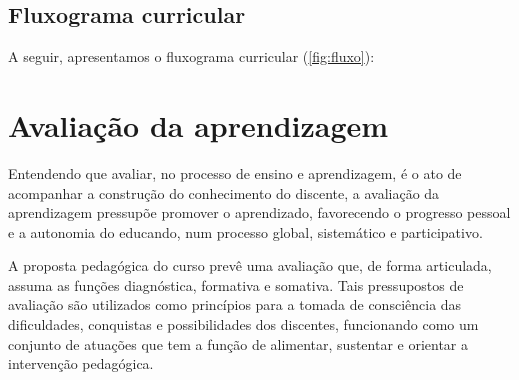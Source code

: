 \documentclass[
	12pt,				%
	openright,			%
	twoside,			%
	a4paper,			%
	chapter=TITLE,		%
	english,			%
	french,				%
	spanish,			%
	brazil,				%
	]{abntex2}
\begin{document}
\begin{landscape}

\section{Fluxograma curricular}

A seguir, apresentamos o fluxograma curricular (\autoref{fig:fluxo}):
\begin{figure}[htpb]

\end{figure}

\end{landscape}
\color{black}

\chapter{Avaliação da aprendizagem}

Entendendo que avaliar, no processo de ensino e aprendizagem, é o ato de acompanhar a construção do conhecimento do discente, a avaliação da aprendizagem pressupõe promover o aprendizado, favorecendo o progresso pessoal e a autonomia do educando, num processo global, sistemático e participativo.

A proposta pedagógica do curso prevê uma avaliação que, de forma articulada, assuma as funções diagnóstica, formativa e somativa. Tais pressupostos de avaliação são utilizados como princípios para a tomada de consciência das dificuldades, conquistas e possibilidades dos discentes, funcionando como um conjunto de atuações que tem a função de alimentar, sustentar e orientar a intervenção pedagógica.
\end{document}
